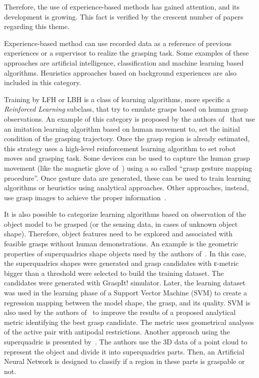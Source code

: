 Therefore, the use of experience-based methods has gained attention, and its development is growing. This fact is verified by the crescent number of papers regarding this theme.

Experience-based method can use recorded data as a reference of previous experiences or a supervisor to realize the grasping task. Some examples of these approaches are artificial intelligence, classification and machine learning based algorithms. Heuristics approaches based on background experiences are also included in this category. 

Training by \ac{LFH} or \ac{LBH} is a class of learning algorithms, more specific a \textit{Reinforced Learning} subclass, that try to emulate grasps based on human grasp observations. An example of this category is proposed by the authors of~\cite{kroemer2010combining} that use an imitation learning algorithm based on human movement to, set the initial condition of the grasping trajectory. Once the grasp region is already estimated, this strategy uses a high-level reinforcement learning algorithm to set robot moves and grasping task. Some devices can be used to capture the human grasp movement (like the magnetic glove of~\cite{ekvall2007learning}) using a so called “grasp gesture mapping procedure”. Once gesture data are generated, these can be used to train learning algorithms or heuristics using analytical approaches. Other approaches, instead, use grasp images to achieve the proper information~\cite{romero2009modeling}.

It is also possible to categorize learning algorithms based on observation of the object model to be grasped (or the sensing data, in cases of unknown object shape). Therefore, object features need to be explored and associated with feasible grasps without human demonstrations. An example is the geometric properties of superquadrics shape objects used by the authors of~\cite{pelossof2004svm}. In this case, the superquadrics shapes were generated and grasp candidates with ε-metric bigger than a threshold were selected to build the training dataset. The candidates were generated with GraspIt! simulator. Later, the learning dataset was used in the learning phase of a Support Vector Machine (SVM) to create a regression mapping between the model shape, the grasp, and its quality. SVM is also used by the authors of~\cite{ten2018using} to improve the results of a proposed analytical metric identifying the best grasp candidate. The metric uses geometrical analyses of the active pair with antipodal restrictions. Another approach using the superquadric is presented by~\cite{el2008handling}. The authors use the 3D data of a point cloud to represent the object and divide it into superquadrics parts. Then, an Artificial Neural Network is designed to classify if a region in these parts is graspable or not.

